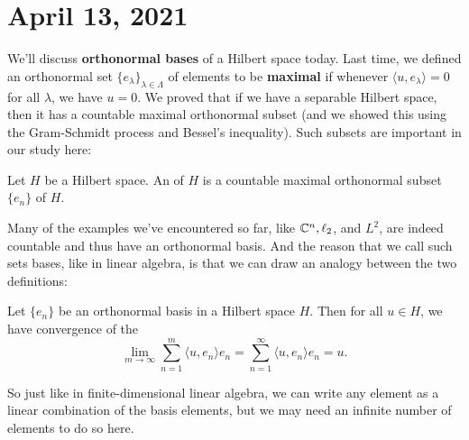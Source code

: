 \pagebreak\section*{April 13, 2021}

We'll discuss \textbf{orthonormal bases} of a Hilbert space today. Last time, we defined an orthonormal set $\{e_{\lambda}\}_{\lambda \in \Lambda}$ of elements to be \textbf{maximal} if whenever $\langle u, e_\lambda \rangle = 0$ for all $\lambda$, we have $u = 0$. We proved that if we have a separable Hilbert space, then it has a countable maximal orthonormal subset (and we showed this using the Gram-Schmidt process and Bessel's inequality). Such subsets are important in our study here:

\begin{definition}
Let $H$ be a Hilbert space. An  of $H$ is a countable maximal orthonormal subset $\{e_n\}$ of $H$.
\end{definition}

Many of the examples we've encountered so far, like $\mathbb C^n, \ell_2$, and $L^2$, are indeed countable and thus have an orthonormal basis. And the reason that we call such sets bases, like in linear algebra, is that we can draw an analogy between the two definitions:

\begin{theorem}\label{orthonormconv}
Let $\{e_n\}$ be an orthonormal basis in a Hilbert space $H$. Then for all $u \in H$, we have convergence of the 
\[
    \lim_{m \to \infty} \sum_{n=1}^m \langle u, e_n \rangle e_n = \sum_{n=1}^\infty \langle u, e_n \rangle e_n = u.
\]
\end{theorem}

So just like in finite-dimensional linear algebra, we can write any element as a linear combination of the basis elements, but we may need an infinite number of elements to do so here.

